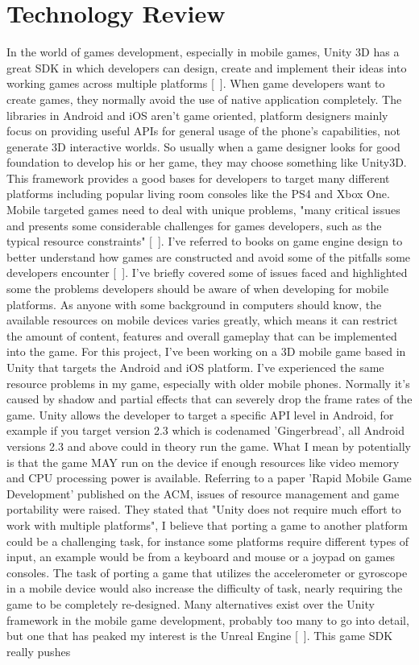 \chapter{Technology Review}
In the world of games development, especially in mobile games, Unity 3D has a great SDK in which developers can design, create and implement their ideas into working games across multiple platforms [~\cite{Unity3D}]. When game developers want to create games, they normally avoid the use of native application completely. The libraries in Android and iOS aren't game oriented, platform designers mainly focus on providing useful APIs for general usage of the phone's capabilities, not generate 3D interactive worlds. So usually when a game designer looks for good foundation to develop his or her game, they may choose something like Unity3D. This framework provides a good bases for developers to target many different platforms including popular living room consoles like the PS4 and Xbox One. Mobile targeted games need to deal with unique problems, "many critical issues and presents some considerable challenges for games developers, such as the typical resource constraints" [~\cite{Game-Engine-Architecture}]. I've referred to books on game engine design to better understand how games are constructed and avoid some of the pitfalls some developers encounter [~\cite{RAD-Game-Development}]. I've briefly covered some of issues faced and highlighted some the problems developers should be aware of when developing for mobile platforms. As anyone with some background in computers should know, the available resources on mobile devices varies greatly, which means it can restrict the amount of content, features and overall gameplay that can be implemented into the game. For this project, I've been working on a 3D mobile game based in Unity that targets the Android and iOS platform. I've experienced the same resource problems in my game, especially with older mobile phones. Normally it’s caused by shadow and partial effects that can severely drop the frame rates of the game. Unity allows the developer to target a specific API level in Android, for example if you target version 2.3 which is codenamed 'Gingerbread', all Android versions 2.3 and above could in theory run the game. What I mean by potentially is that the game MAY run on the device if enough resources like video memory and CPU processing power is available. Referring to a paper 'Rapid Mobile Game Development' published on the ACM, issues of resource management and game portability were raised. They stated that "Unity does not require much effort to work with multiple platforms", I believe that porting a game to another platform could be a challenging task, for instance some platforms require different types of input, an example would be from a keyboard and mouse or a joypad on games consoles. The task of porting a game that utilizes the accelerometer or gyroscope in a mobile device would also increase the difficulty of task, nearly requiring the game to be completely re-designed. Many alternatives exist over the Unity framework in the mobile game development, probably too many to go into detail, but one that has peaked my interest is the Unreal Engine [~\cite{Unreal-Engine}]. This game SDK really pushes 